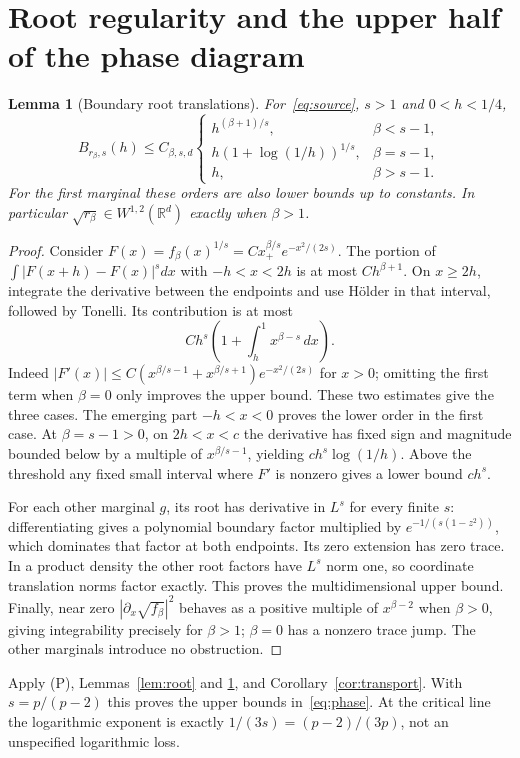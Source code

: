\documentclass[11pt]{article}
\newtheorem{lemma}[theorem]{Lemma}
\theoremstyle{remark}\newtheorem{remark}[theorem]{Remark}
\newcommand{\R}{\mathbb R}\newcommand{\E}{\mathbb E}
\begin{document}
\section{Root regularity and the upper half of the phase diagram}\label{sec:upper}
\begin{lemma}[Boundary root translations]\label{lem:beta}
For~\eqref{eq:source}, $s>1$ and $0<h<1/4$,
\[
 B_{r_\beta,s}(h)\le C_{\beta,s,d}
 \begin{cases}
 h^{(\beta+1)/s},&\beta<s-1,\\
 h(1+\log(1/h))^{1/s},&\beta=s-1,\\
 h,&\beta>s-1.
 \end{cases}
\]
For the first marginal these orders are also lower bounds up to constants. In particular $\sqrt{r_\beta}\in W^{1,2}(\R^d)$ exactly when $\beta>1$.
\end{lemma}
\begin{proof}
Consider $F(x)=f_\beta(x)^{1/s}=C x_+^{\beta/s}e^{-x^2/(2s)}$. The portion of
$\int|F(x+h)-F(x)|^s dx$ with $-h<x<2h$ is at most $C h^{\beta+1}$. On $x\ge2h$, integrate the derivative between the endpoints and use H\"older in that interval, followed by Tonelli. Its contribution is at most
\[
 C h^s\left(1+\int_h^1 x^{\beta-s}\,dx\right).
\]
Indeed $|F'(x)|\le C(x^{\beta/s-1}+x^{\beta/s+1})e^{-x^2/(2s)}$ for $x>0$; omitting the first term when $\beta=0$ only improves the upper bound. These two estimates give the three cases. The emerging part $-h<x<0$ proves the lower order in the first case. At $\beta=s-1>0$, on $2h<x<c$ the derivative has fixed sign and magnitude bounded below by a multiple of $x^{\beta/s-1}$, yielding $c h^s\log(1/h)$. Above the threshold any fixed small interval where $F'$ is nonzero gives a lower bound $c h^s$.

For each other marginal $g$, its root has derivative in $L^s$ for every finite $s$: differentiating gives a polynomial boundary factor multiplied by $e^{-1/(s(1-z^2))}$, which dominates that factor at both endpoints. Its zero extension has zero trace. In a product density the other root factors have $L^s$ norm one, so coordinate translation norms factor exactly. This proves the multidimensional upper bound. Finally, near zero $|\partial_x\sqrt{f_\beta}|^2$ behaves as a positive multiple of $x^{\beta-2}$ when $\beta>0$, giving integrability precisely for $\beta>1$; $\beta=0$ has a nonzero trace jump. The other marginals introduce no obstruction.
\end{proof}

Apply (P), Lemmas~\ref{lem:root} and \ref{lem:beta}, and Corollary~\ref{cor:transport}. With $s=p/(p-2)$ this proves the upper bounds in~\eqref{eq:phase}. At the critical line the logarithmic exponent is exactly $1/(3s)=(p-2)/(3p)$, not an unspecified logarithmic loss.
\end{document}
